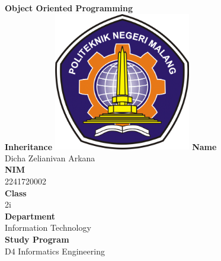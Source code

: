 \documentclass[12pt,titlepage]{article}
\newcommand{\vSubject}{Object Oriented Programming}
\newcommand{\vSubtitle}{Inheritance}
\newcommand{\vName}{Dicha Zelianivan Arkana}
\newcommand{\vNIM}{2241720002}
\newcommand{\vClass}{2i}
\newcommand{\vDepartment}{Information Technology}
\newcommand{\vStudyProgram}{D4 Informatics Engineering}
\begin{document}
\begin{titlepage}
    \centering
    \vfill
    {\bfseries\LARGE
        \vSubject\\
        \vskip0.25cm
        \vSubtitle
    }
    \vfill
    \includegraphics[width=6cm]{images/polinema-logo.png}
    \vfill
    {
        \textbf{Name}\\
        \vName\\
        \vskip0.5cm
        \textbf{NIM}\\
        \vNIM\\
        \vskip0.5cm
        \textbf{Class}\\
        \vClass\\
        \vskip0.5cm
        \textbf{Department}\\
        \vDepartment\\
        \vskip0.5cm
        \textbf{Study Program}\\
        \vStudyProgram
    }
\end{titlepage}
\end{document}

